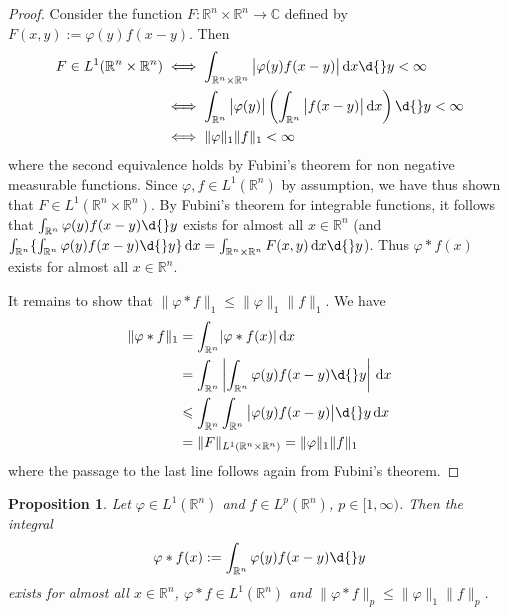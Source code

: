\documentclass[12pt, oneside, a4paper]{article}
\newtheorem{prop}[thm]{Proposition}
\theoremstyle{dfn}
\def\Rbb{\ensuremath{\mathbb{R}}}
\def\dx{\,\mathrm dx}
\providecommand{\norm}[1]{\lVert#1\rVert}
\newcommand{\Com}{\mathbb{C}}
\providecommand{\abs}[1]{\lvert#1\rvert}
\providecommand{\absbig}[1]{\big\lvert#1\big\rvert}
\providecommand{\Abs}[1]{\left\lvert#1\right\rvert}
\begin{document}
\begin{proof}
Consider the function $F\colon \Rbb^n \times \Rbb^n \to \Com$ defined by $F(x,y) := \varphi(y) f(x-y)$. Then
\begin{align*}
	F \in L^1(\Rbb^n \times \Rbb^n)
	&\iff \int_{\Rbb^n \times \Rbb^n} \absbig{\varphi(y) f(x-y)} \dx \d{}y < \infty \\
	&\iff \int_{\Rbb^n} \absbig{\varphi(y)} \left( \int_{\Rbb^n} \absbig{f(x-y)} \dx \right) \d{}y < \infty \\
	&\iff \norm{\varphi}_1\norm{f}_1 < \infty
\end{align*}
where the second equivalence holds by Fubini's theorem for non negative measurable functions. Since $\varphi, f \in L^1(\Rbb^n)$ by assumption, we have thus shown that $F \in L^1(\Rbb^n \times \Rbb^n)$. By Fubini's theorem for integrable functions, it follows that $\int_{\Rbb^n} \varphi(y) f(x-y) \d{}y$ exists for almost all $x \in \Rbb^n$ (and $\int_{\Rbb^n} \{ \int_{\Rbb^n} \varphi(y) f(x-y) \d{}y \} \dx = \int_{\Rbb^n \times \Rbb^n} F(x,y) \dx \d{}y$). Thus $\varphi * f(x)$ exists for almost all $x \in \Rbb^n$.

It remains to show that $\norm{\varphi * f}_1 \leqslant \norm{\varphi}_1 \norm{f}_1$. We have
\begin{align*}
	\norm{\varphi * f}_1
	&= \int_{\Rbb^n} \abs{\varphi * f(x)} \dx \\
	&= \int_{\Rbb^n} \Abs{\int_{\Rbb^n} \varphi(y) f(x-y) \d{}y} \dx \\
	&\leqslant \int_{\Rbb^n} \int_{\Rbb^n} \absbig{\varphi(y) f(x-y)} \d{}y \dx \\
	&= \norm{F}_{L^1(\Rbb^n \times \Rbb^n)} = \norm{\varphi}_1 \norm{f}_1
\end{align*}
where the passage to the last line follows again from Fubini's theorem.
\end{proof}

\begin{prop}\label{Prop:ConvolutionLp}
Let $\varphi \in L^1(\Rbb^n)$ and $f \in L^p(\Rbb^n)$, $p \in [1,\infty)$. Then the integral
\begin{equation}\label{Eq:Prop:ConvolutionLp}
\varphi * f(x)
:= \int_{\Rbb^n} \varphi(y) f(x-y) \d{}y
\end{equation}
exists for almost all $x \in \Rbb^n$, $\varphi * f \in L^1(\Rbb^n)$ and $\norm{\varphi * f}_p \leqslant \norm{\varphi}_1 \norm{f}_p$.
\end{prop}
\end{document}
